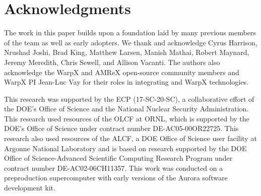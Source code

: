 \section{Acknowledgments}


The work in this paper builds upon a foundation laid by many previous members of the \vtkm team as well as early adopters.  We thank and acknowledge
Cyrus Harrison, 
Nrushad Joshi,
Brad King, 
Matthew Larsen,
Manish Mathai,
Robert Maynard, 
Jeremy Meredith, 
Chris Sewell,
and
Allison Vacanti.
The authors also acknowledge
the WarpX and AMReX open-source community members and WarpX PI Jean-Luc Vay
for their roles in integrating \vtkm and WarpX technologies.

This research was supported by the ECP (17-SC-20-SC), a collaborative effort of the DOE's Office of Science and the National Nuclear Security Administration.
This research used resources of the OLCF at ORNL, which is supported by the DOE's Office of Science under contract number DE-AC05-00OR22725.
This research also used resources of the ALCF, a DOE Office of Science user facility at Argonne National Laboratory and is based on research supported by the DOE Office of Science-Advanced Scientific Computing Research Program under contract number DE-AC02-06CH11357. This work was conducted on a preproduction supercomputer with early versions of the Aurora software development kit.
